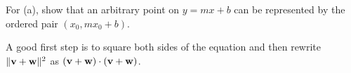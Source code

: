 \begin{hint}
  For (a), show that an arbitrary point on $y=mx+b$ can be represented by the ordered pair $(x_0,mx_0+b)$.
\end{hint}

\begin{hint}
  A good first step is to square both sides of the equation and then rewrite $\|\mathbf v+\mathbf w\|^2$ as $(\mathbf v+\mathbf w)\cdot(\mathbf v+\mathbf w)$.
\end{hint}
